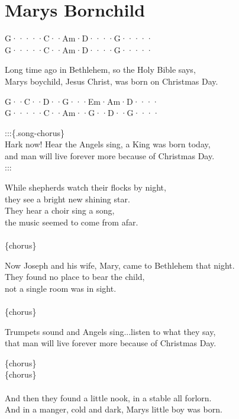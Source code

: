 \documentclass[
  letterpaper,
  twoside=false]{scrbook}
\begin{document}
\hypertarget{marys-bornchild}{%
\chapter{Marys Bornchild}\label{marys-bornchild}}

G·····\textbar C··Am·\textbar D····\textbar G·····\textbar{}\\
G·····\textbar C··Am·\textbar D····\textbar G·····\textbar{}

Long time ago in Bethlehem, so the Holy Bible says, ~\\
Mary\textquotesingle s boychild, Jesus Christ, was born on Christmas
Day.

G··C··\textbar D··G···\textbar Em·Am·\textbar D····\textbar{}\\
G·····\textbar C··Am··\textbar G··D··\textbar G····\textbar{}

:::\{.song-chorus\}\\
Hark now! Hear the Angels sing, a King was born today,\\
and man will live forever more because of Christmas Day.\\
::: ~

While shepherds watch their flocks by night,\\
they see a bright new shining star.\\
They hear a choir sing a song, ~\\
the music seemed to come from afar. ~\\
\hspace*{0.333em}\\
\{chorus\}

Now Joseph and his wife, Mary, came to Bethlehem that night.\\
They found no place to bear the child, ~\\
not a single room was in sight. ~ ~ ~\\
\hspace*{0.333em}\\
\{chorus\}

Trumpets sound and Angels sing...listen to what they say,\\
that man will live forever more because of Christmas Day.

\{chorus\}\\
\{chorus\}\\
\hspace*{0.333em}\\
And then they found a little nook, in a stable all forlorn.\\
And in a manger, cold and dark, Mary\textquotesingle s little boy was
born.
\end{document}

